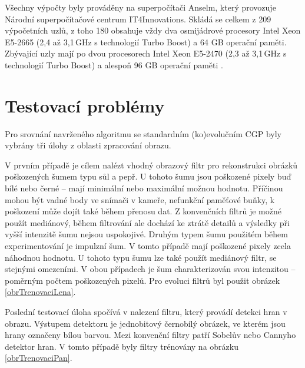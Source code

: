 Všechny výpočty byly prováděny na superpočítači Anselm, který provozuje Národní superpočítačové centrum IT4Innovations. Skládá se celkem z 209 výpočetních uzlů, z toho 180 obsahuje vždy dva osmijádrové procesory Intel Xeon E5-2665 (2,4 až 3,1\,GHz s technologií Turbo Boost) a 64 GB operační paměti. Zbývající uzly mají po dvou procesorech Intel Xeon E5-2470 (2,3 až 3,1\,GHz s technologií Turbo Boost) a alespoň 96 GB operační paměti \cite{AnselmSpecs}.

\section{Testovací problémy}

Pro srovnání navrženého algoritmu se standardním (ko)evolučním CGP byly vybrány tři úlohy z oblasti zpracování obrazu.

V prvním případě je cílem nalézt vhodný obrazový filtr pro rekonstrukci obrázků poškozených šumem typu sůl a pepř. U tohoto šumu jsou poškozené pixely buď bílé nebo černé -- mají minimální nebo maximální možnou hodnotu. Příčinou mohou být vadné body ve snímači v kameře, nefunkční paměťové buňky, k poškození může dojít také během přenosu dat. Z konvenčních filtrů je možné použít mediánový, během filtrování ale dochází ke ztrátě detailů a výsledky při vyšší intenzitě šumu nejsou uspokojivé. Druhým typem šumu použitém během experimentování je impulzní šum. V tomto případě mají poškozené pixely zcela náhodnou hodnotu. U tohoto typu šumu lze také použít mediánový filtr, se stejnými omezeními. V obou případech je šum charakterizován svou intenzitou -- poměrným počtem poškozených pixelů. Pro evoluci filtrů byl použit obrázek \ref{obrTrenovaciLena}.

Poslední testovací úloha spočívá v nalezení filtru, který provádí detekci hran v obrazu. Výstupem detektoru je jednobitový černobílý obrázek, ve kterém jsou hrany označeny bílou barvou. Mezi konvenční filtry patří Sobelův nebo Cannyho detektor hran. V tomto případě byly filtry trénovány na obrázku \ref{obrTrenovaciPan}.

